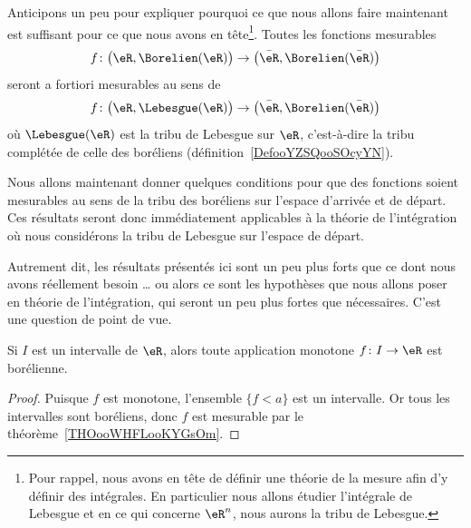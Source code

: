 \begin{normaltext}      \label{NORMooNFOMooYnaflN}
	Anticipons un peu pour expliquer pourquoi ce que nous allons faire maintenant est suffisant pour ce que nous avons en tête\footnote{Pour rappel, nous avons en tête de définir une théorie de la mesure afin d'y définir des intégrales. En particulier nous allons étudier l'intégrale de Lebesgue et en ce qui concerne \( \eR^n\), nous aurons la tribu de Lebesgue.}. Toutes les fonctions mesurables
	\begin{equation}
		f\colon \big( \eR,\Borelien(\eR) \big)\to \big( \bar\eR,\Borelien(\bar \eR) \big)
	\end{equation}
	seront a fortiori mesurables au sens de
	\begin{equation}
		f\colon \big( \eR,\Lebesgue(\eR) \big)\to \big( \bar\eR,\Borelien(\bar \eR) \big)
	\end{equation}
	où \( \Lebesgue(\eR)\) est la tribu de Lebesgue sur \( \eR\), c'est-à-dire la tribu complétée de celle des boréliens (définition~\ref{DefooYZSQooSOcyYN}).
\end{normaltext}

\begin{normaltext}
	Nous allons maintenant donner quelques conditions pour que des fonctions soient mesurables au sens de la tribu des boréliens sur l'espace d'arrivée et de départ. Ces résultats seront donc immédiatement applicables à la théorie de l'intégration où nous considérons la tribu de Lebesgue sur l'espace de départ.

	Autrement dit, les résultats présentés ici sont un peu plus forts que ce dont nous avons réellement besoin \ldots{} ou alors ce sont les hypothèses que nous allons poser en théorie de l'intégration, qui seront un peu plus fortes que nécessaires. C'est une question de point de vue.
\end{normaltext}

\begin{corollary}       \label{CorooJYDVooCrXVun}
	Si \( I\) est un intervalle de \( \eR\), alors toute application monotone \( f\colon I\to \eR\) est borélienne.
\end{corollary}

\begin{proof}
	Puisque \( f\) est monotone, l'ensemble \( \{ f<a \}\) est un intervalle. Or tous les intervalles sont boréliens, donc \( f\) est mesurable par le théorème~\ref{THOooWHFLooKYGsOm}.
\end{proof}

